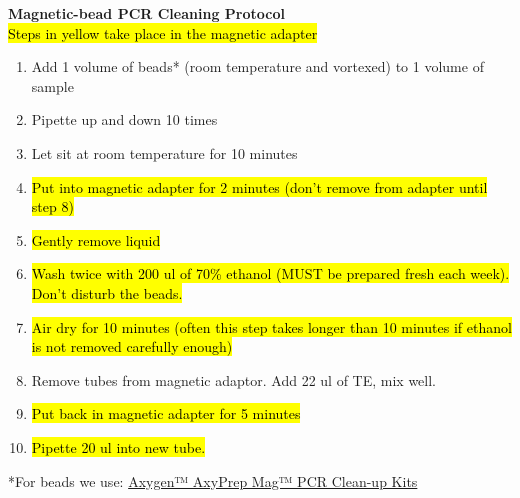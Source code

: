 \documentclass[11pt]{article}
\begin{document}
\begin{center}
\textbf{\large{Magnetic-bead PCR Cleaning Protocol}}
\break
\\
\hl{Steps in yellow take place in the magnetic adapter}
\end{center}

\begin{enumerate}
\item Add 1 volume of beads* (room temperature and vortexed) to 1 volume of sample
\item Pipette up and down 10 times
\item Let sit at room temperature for 10 minutes
\item \hl{Put into magnetic adapter for 2 minutes (don't remove from adapter until step 8)}
\item \hl{Gently remove liquid}
\item \hl{Wash twice with 200 ul of 70\% ethanol (MUST be prepared fresh each week). Don't disturb the beads.}
\item \hl{Air dry for 10 minutes (often this step takes longer than 10 minutes if ethanol is not removed carefully enough)}
\item Remove tubes from magnetic adaptor. Add 22 ul of TE, mix well.
\item \hl{Put back in magnetic adapter for 5 minutes}
\item \hl{Pipette 20 ul into new tube.}
\end{enumerate}
\bigskip
\break
*For beads we use:
\href{http://www.fishersci.com/ecomm/servlet/fsproductdetail?
position=content&tab=Items&productId=14205843&fromSearch=0&catlogId=29104&storeId=10652
&langId=-1}{Axygen™ AxyPrep Mag™ PCR Clean-up Kits} 
\end{document}

